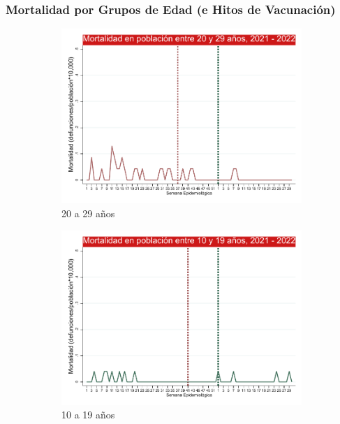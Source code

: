 \documentclass[xcolor=table]{beamer}
\begin{document}
\begin{frame}
	\frametitle{Mortalidad por Grupos de Edad (e Hitos de Vacunación)}
	\vspace{-.2cm}
	\hfill
	\begin{figure}
		\begin{subfigure}[b]{0.3\textwidth}

			\includegraphics[width=\textwidth]{../figuras/mortalidad_edad_20.pdf}
			\caption{20 a 29 años}
		\end{subfigure}
		\centering
		\begin{subfigure}[b]{0.3\textwidth}
			\includegraphics[width=\textwidth]{../figuras/mortalidad_edad_10.pdf}
			\caption{10 a 19 años}
		\end{subfigure}
		\begin{subfigure}[b]{0.3\textwidth}


\end{subfigure}
\end{figure}
\end{frame}
\end{document}
